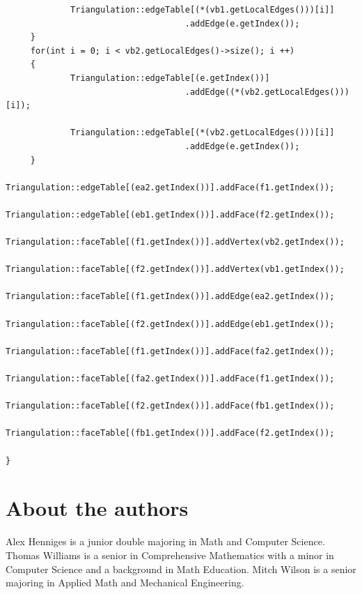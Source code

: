\documentclass[12pt]{article}
\begin{document}
\begin{verbatim}
             Triangulation::edgeTable[(*(vb1.getLocalEdges()))[i]]
             						.addEdge(e.getIndex()); 
     }
     for(int i = 0; i < vb2.getLocalEdges()->size(); i ++)
     {
             Triangulation::edgeTable[(e.getIndex())]
             						.addEdge((*(vb2.getLocalEdges()))[i]); 
             						
             Triangulation::edgeTable[(*(vb2.getLocalEdges()))[i]]
             						.addEdge(e.getIndex()); 
     }
     Triangulation::edgeTable[(ea2.getIndex())].addFace(f1.getIndex()); 
     Triangulation::edgeTable[(eb1.getIndex())].addFace(f2.getIndex()); 
     Triangulation::faceTable[(f1.getIndex())].addVertex(vb2.getIndex());
     Triangulation::faceTable[(f2.getIndex())].addVertex(vb1.getIndex());
     Triangulation::faceTable[(f1.getIndex())].addEdge(ea2.getIndex());
     Triangulation::faceTable[(f2.getIndex())].addEdge(eb1.getIndex());
     Triangulation::faceTable[(f1.getIndex())].addFace(fa2.getIndex());
     Triangulation::faceTable[(fa2.getIndex())].addFace(f1.getIndex());
     Triangulation::faceTable[(f2.getIndex())].addFace(fb1.getIndex());
     Triangulation::faceTable[(fb1.getIndex())].addFace(f2.getIndex());
     
}
\end{verbatim}
\section*{About the authors}

Alex Henniges is a junior double majoring in Math and Computer Science. Thomas Williams is a senior in Comprehensive Mathematics with a minor in Computer Science and a background in Math Education. Mitch Wilson is a senior majoring in Applied Math and Mechanical Engineering.
\end{document}
